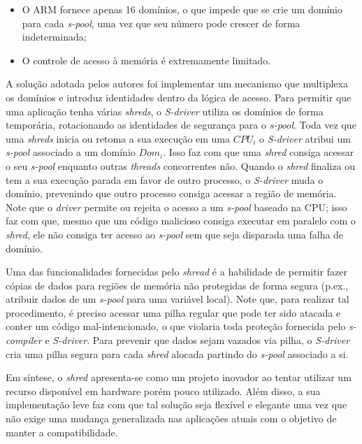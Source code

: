 \begin{itemize}
  \item O ARM fornece apenas 16 domínios, o que impede que se crie um domínio
        para cada \emph{s-pool}, uma vez que seu número pode crescer de forma
        indeterminada;
  \item O controle de acesso à memória é extremamente limitado.
\end{itemize}

A solução adotada pelos autores foi implementar um mecanismo que multiplexa os
domínios e introduz identidades dentro da lógica de acesso. Para permitir que
uma aplicação tenha várias \emph{shreds}, o \emph{S-driver} utiliza os domínios
de forma temporária, rotacionando as identidades de segurança para o
\emph{s-pool}. Toda vez que uma \emph{shreds} inicia ou retoma a sua execução
em uma $CPU_i$ o \emph{S-driver} atribui um \emph{s-pool} associado a um
domínio $Dom_i$. Isso faz com que uma \emph{shred} consiga acessar o seu
\emph{s-pool} enquanto outras \emph{threads} concorrentes não. Quando o
\emph{shred} finaliza ou tem a sua execução parada em favor de outro
processo, o \emph{S-driver} muda o domínio, prevenindo que outro processo
consiga acessar a região de memória. Note que o \emph{driver} permite ou
rejeita o acesso a um \emph{s-pool} baseado na CPU; isso faz com que, mesmo que
um código malicioso consiga executar em paralelo com o \emph{shred}, ele não
consiga ter acesso ao \emph{s-pool} sem que seja disparada uma falha de
domínio.

Uma das funcionalidades fornecidas pelo \emph{shread} é a habilidade de
permitir fazer cópias de dados para regiões de memória não protegidas de forma segura
(p.ex., atribuir dados de um \emph{s-pool} para uma variável local). Note que,
para realizar tal procedimento, é preciso acessar uma pilha regular que pode ter
sido atacada e conter um código mal-intencionado, o que violaria toda proteção
fornecida pelo \emph{s-compiler} e \emph{S-driver}. Para prevenir que dados
sejam vazados via pilha, o \emph{S-driver} cria uma pilha segura para cada
\emph{shred} alocada partindo do \emph{s-pool} associado a si.

Em síntese, o \emph{shred} apresenta-se como um projeto inovador ao tentar
utilizar um recurso disponível em hardware porém pouco utilizado. Além disso, a
sua implementação leve faz com que tal solução seja flexível e elegante uma vez
que não exige uma mudança generalizada nas aplicações atuais com o objetivo de
manter a compatibilidade.

